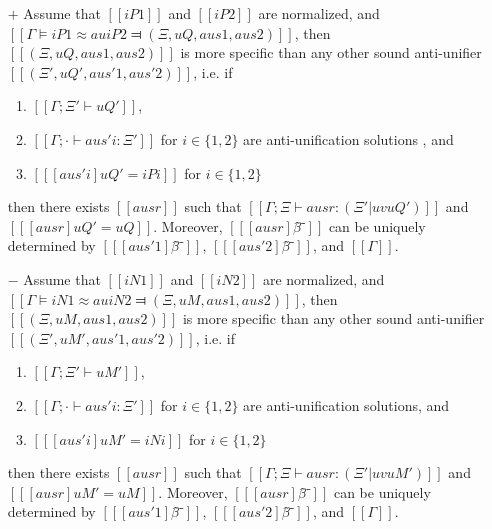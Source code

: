 \begin{lemma} \label{lemma:au-initial}
    \hfill
    \begin{itemize}
        \item [$+$] 
            Assume that $[[iP1]]$ and $[[iP2]]$ are normalized, and
            $[[Γ ⊨ iP1 ≈au iP2 ⫤ (Ξ, uQ, aus1, aus2)]]$, 
            then $[[(Ξ, uQ, aus1, aus2)]]$ is more specific than
            any other sound anti-unifier $[[(Ξ', uQ', aus'1, aus'2)]]$, i.e.
            if 
            \begin{enumerate}
                \item $[[Γ ; Ξ' ⊢ uQ']]$,
                \item $[[Γ ; · ⊢ aus'i : Ξ']]$ for $i \in \{1,2\}$
                are anti-unification solutions , and
                \item $[[ [aus'i] uQ' = iPi ]]$ for $i \in \{1,2\}$
            \end{enumerate}
            then there exists $[[ausr]]$ such that
            $[[Γ ; Ξ ⊢ ausr : (Ξ' | uv uQ')]]$ and $[[ [ausr] uQ' = uQ ]]$. 
            Moreover, $[[ [ausr]β̂⁻]]$ can
            be uniquely determined by $[[ [aus'1]β̂⁻ ]]$, $[[ [aus'2]β̂⁻ ]]$, and
            $[[Γ]]$.
        \item [$-$] 
            Assume that $[[iN1]]$ and $[[iN2]]$ are normalized, and
            $[[Γ ⊨ iN1 ≈au iN2 ⫤ (Ξ, uM, aus1, aus2)]]$, 
            then $[[(Ξ, uM, aus1, aus2)]]$ is more specific than
            any other sound anti-unifier $[[(Ξ', uM', aus'1, aus'2)]]$, i.e.
            if
            \begin{enumerate}
                \item $[[Γ ; Ξ' ⊢ uM']]$,
                \item $[[Γ ; · ⊢ aus'i : Ξ']]$ for $i \in \{1,2\}$
                are anti-unification solutions, and
                \item $[[ [aus'i] uM' = iNi ]]$ for $i \in \{1,2\}$
            \end{enumerate}
            then there exists $[[ausr]]$ such that
            $[[Γ ; Ξ ⊢ ausr : (Ξ' | uv uM')]]$ and $[[ [ausr] uM' = uM ]]$.
            Moreover, $[[ [ausr]β̂⁻]]$ can
            be uniquely determined by $[[ [aus'1]β̂⁻ ]]$, $[[ [aus'2]β̂⁻ ]]$, and
            $[[Γ]]$.
    \end{itemize}
\end{lemma}
